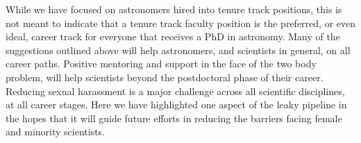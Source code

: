 \documentclass[modern]{aastex62}
\begin{document}
While we have focused on astronomers hired into tenure track positions, this is not meant to indicate that a tenure track faculty position is the preferred, or even ideal, career track for everyone that receives a PhD in astronomy. Many of the suggestions outlined above will help astronomers, and scientists in general, on all career paths. Positive mentoring and support in the face of the two body problem, will help scientists beyond the postdoctoral phase of their career. Reducing sexual harassment is a major challenge across all scientific disciplines, at all career stages. Here we have highlighted one aspect of the leaky pipeline in the hopes that it will guide future efforts in reducing the barriers facing female and minority scientists. 







\end{document}
